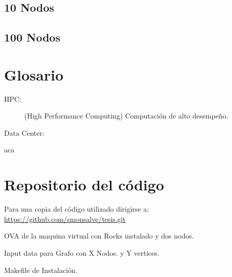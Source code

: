 \documentclass[twoside,letterpaper,12pt]{report}
\begin{document}
\section{10 Nodos}
\section{100 Nodos}



\chapter{Glosario}
\label{chapGlosario}

\begin{description}
	\item[HPC:] (High Performance Computing) Computación de alto desempeño.
	\item[Data Center:]
\end{description}

\newpage



	
aca
\cite{czarnecki2000generative}
\cite{wwwboost}
\cite{stroustrup2013c++}
\cite{andrei2001modern}
\cite{Wall2000}
\cite{Boost}
\cite{Karniadakis}
\cite{Kernighan1988}


\todo[inline,caption={TODO}]{
}

\newpage

\appendix
\chapter{Repositorio del código}

Para una copia del código utilizado dirigirse a: \url{https://github.com/smonsalve/tesis.git}

OVA de la maquina virtual con Rocks instalado y dos nodos.

Input data para Grafo con X Nodos. y Y vertices.

Makefile de Instalación.
\end{document}
